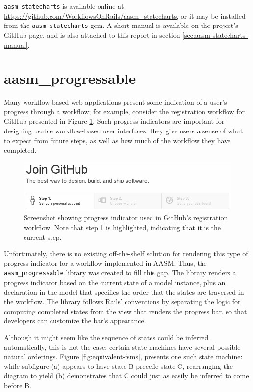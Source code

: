 \documentclass[document.tex]{subfiles}
\begin{document}
\verb!aasm_statecharts! is available online at \url{https://github.com/WorkflowsOnRails/aasm_statecharts}, or it may be installed from the \verb!aasm_statecharts! gem.
A short manual is available on the project's GitHub page, and is also attached to this report in section \ref{sec:aasm-statecharts-manual}.


\section {aasm\_progressable}
\label {sec:aasm-progressable}

Many workflow-based web applications present some indication of a user's progress through a workflow; for example, consider the registration workflow for GitHub presented in Figure \ref{fig:github-registration}. Such progress indicators are important for designing usable workflow-based user interfaces: they give users a sense of what to expect from future steps, as well as how much of the workflow they have completed.

\begin{figure}[!htbp]
  \centering
  \includegraphics[width=6in]{./img/platform/github-registration}
  \cprotect
  \caption{Screenshot showing progress indicator used in GitHub's registration workflow. Note that step 1 is highlighted, indicating that it is the current step.}
  \label{fig:github-registration}
\end{figure}

Unfortunately, there is no existing off-the-shelf solution for rendering this type of progress indicator for a workflow implemented in AASM. Thus, the \verb!aasm_progressable! \cite{aasm_progressable} library was created to fill this gap. The library renders a progress indicator based on the current state of a model instance, plus an declaration in the model that specifies the order that the states are traversed in the workflow. The library follows Rails' conventions by separating the logic for computing completed states from the view that renders the progress bar, so that developers can customize the bar's appearance.

Although it might seem like the sequence of states could be inferred automatically, this is not the case; certain state machines have several possible natural orderings. Figure \ref{fig:equivalent-fsms}, presents one such state machine: while subfigure (a) appears to have state B precede state C, rearranging the diagram to yield (b) demonstrates that C could just as easily be inferred to come before B.
\end{document}

